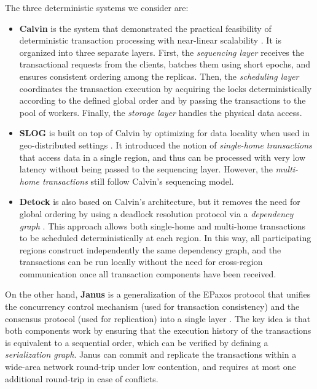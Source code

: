 The three deterministic systems we consider are:
\begin{itemize}
    \item \textbf{Calvin} is the system that demonstrated the practical feasibility of deterministic transaction processing with near-linear scalability \cite{thomson2012calvin}. It is organized into three separate layers. First, the \textit{sequencing layer} receives the transactional requests from the clients, batches them using short epochs, and ensures consistent ordering among the replicas. Then, the \textit{scheduling layer} coordinates the transaction execution by acquiring the locks deterministically according to the defined global order and by passing the transactions to the pool of workers. Finally, the \textit{storage layer} handles the physical data access.
    \item \textbf{SLOG} is built on top of Calvin by optimizing for data locality when used in geo-distributed settings \cite{ren2019slog}. It introduced the notion of \textit{single-home transactions} that access data in a single region, and thus can be processed with very low latency without being passed to the sequencing layer. However, the \textit{multi-home transactions} still follow Calvin's sequencing model.
    \item \textbf{Detock} is also based on Calvin's architecture, but it removes the need for global ordering by using a deadlock resolution protocol via a \textit{dependency graph} \cite{nguyen2023detock}. This approach allows both single-home and multi-home transactions to be scheduled deterministically at each region. In this way, all participating regions construct independently the same dependency graph, and the transactions can be run locally without the need for cross-region communication once all transaction components have been received.
\end{itemize}

On the other hand, \textbf{Janus} is a generalization of the EPaxos protocol that unifies the concurrency control mechanism (used for transaction consistency) and the consensus protocol (used for replication) into a single layer \cite{mu2016consolidating}. The key idea is that both components work by ensuring that the execution history of the transactions is equivalent to a sequential order, which can be verified by defining a \textit{serialization graph}. Janus can commit and replicate the transactions within a wide-area network round-trip under low contention, and requires at most one additional round-trip in case of conflicts.


